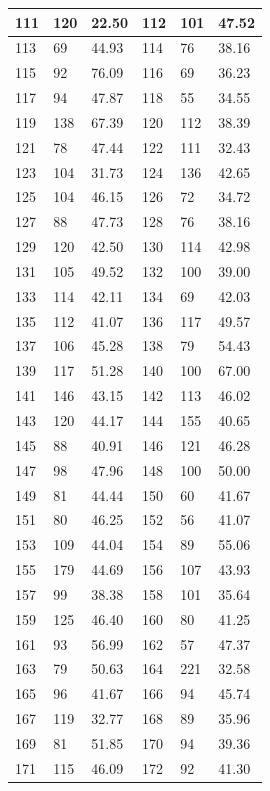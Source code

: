 \documentclass[10.9pt]{article} %
\begin{document}
{\begin{longtable}{|p{2cm}|p{2cm}|p{2cm}|p{2cm}|p{2cm}|p{2cm}|}
\hline
111 & 120& 22.50 & 112 & 101& 47.52\\
\hline
113 & 69& 44.93 & 114 & 76& 38.16\\
\hline
115 & 92& 76.09 & 116 & 69& 36.23\\
\hline
117 & 94& 47.87 & 118 & 55& 34.55\\
\hline
119 & 138& 67.39 & 120 & 112& 38.39\\
\hline
121 & 78& 47.44 & 122 & 111& 32.43\\
\hline
123 & 104& 31.73 & 124 & 136& 42.65\\
\hline
125 & 104& 46.15 & 126 & 72& 34.72\\
\hline
127 & 88& 47.73 & 128 & 76& 38.16\\
\hline
129 & 120& 42.50 & 130 & 114& 42.98\\
\hline
131 & 105& 49.52 & 132 & 100& 39.00\\
\hline
133 & 114& 42.11 & 134 & 69& 42.03\\
\hline
135 & 112& 41.07 & 136 & 117& 49.57\\
\hline
137 & 106& 45.28 & 138 & 79& 54.43\\
\hline
139 & 117& 51.28 & 140 & 100& 67.00\\
\hline
141 & 146& 43.15 & 142 & 113& 46.02\\
\hline
143 & 120& 44.17 & 144 & 155& 40.65\\
\hline
145 & 88& 40.91 & 146 & 121& 46.28\\
\hline
147 & 98& 47.96 & 148 & 100& 50.00\\
\hline
149 & 81& 44.44 & 150 & 60& 41.67\\
\hline
151 & 80& 46.25 & 152 & 56& 41.07\\
\hline
153 & 109& 44.04 & 154 & 89& 55.06\\
\hline
155 & 179& 44.69 & 156 & 107& 43.93\\
\hline
157 & 99& 38.38 & 158 & 101& 35.64\\
\hline
159 & 125& 46.40 & 160 & 80& 41.25\\
\hline
161 & 93& 56.99 & 162 & 57& 47.37\\
\hline
163 & 79& 50.63 & 164 & 221& 32.58\\
\hline
165 & 96& 41.67 & 166 & 94& 45.74\\
\hline
167 & 119& 32.77 & 168 & 89& 35.96\\
\hline
169 & 81& 51.85 & 170 & 94& 39.36\\
\hline
171 & 115& 46.09 & 172 & 92& 41.30\\

\end{longtable}}
\end{document}
